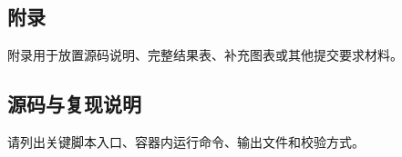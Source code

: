 \begin{appendices}
\section{附录}
\label{sec:appendix}

附录用于放置源码说明、完整结果表、补充图表或其他提交要求材料。

\subsection{源码与复现说明}

请列出关键脚本入口、容器内运行命令、输出文件和校验方式。
\end{appendices}
